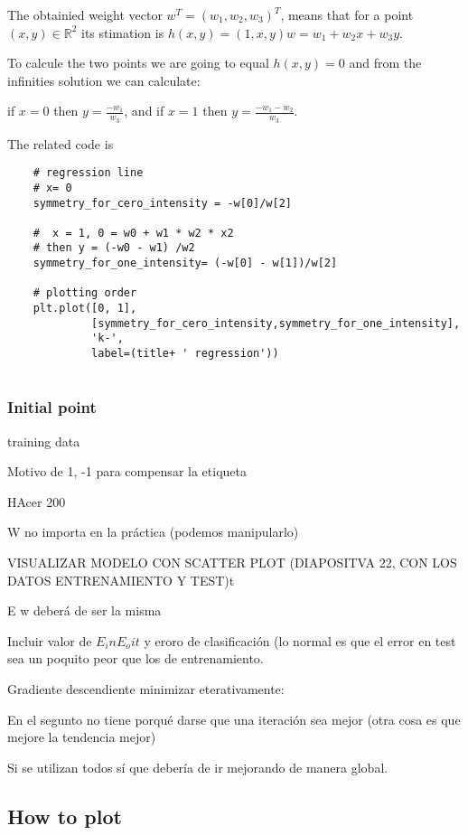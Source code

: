   The obtainied weight vector $w^T = (w_1,w_2,w_3)^T$, means that for a point $(x,y) \in \mathbb R^2$
  its stimation is $h(x,y) = (1,x,y) w = w_1 + w_2x + w_3y$.

  To calcule the two points we are going to equal $h(x,y)=0$ and from the infinities solution we can calculate:

  if $x=0$ then $y = \frac{- w_1}{w_3}$, and if  $x=1$ then $y = \frac{- w_1 - w_2}{w_3}.$
  

  The related code is


  \begin{verbatim}
    # regression line
    # x= 0
    symmetry_for_cero_intensity = -w[0]/w[2]

    #  x = 1, 0 = w0 + w1 * w2 * x2
    # then y = (-w0 - w1) /w2
    symmetry_for_one_intensity= (-w[0] - w[1])/w[2]

    # plotting order
    plt.plot([0, 1],
             [symmetry_for_cero_intensity,symmetry_for_one_intensity],
             'k-',
             label=(title+ ' regression'))
     
  \end{verbatim}

  
  
 
\subsubsection{Initial point}  
training data

Motivo de 1, -1 para compensar la etiqueta

HAcer 200

W no importa en la práctica (podemos manipularlo)

VISUALIZAR MODELO CON SCATTER PLOT (DIAPOSITVA 22, CON LOS DATOS ENTRENAMIENTO Y TEST)t

E w deberá de ser la misma

Incluir valor de $E_in E_oit$ y eroro de clasificación (lo normal es que el error en test sea un poquito peor que los de entrenamiento.

Gradiente descendiente minimizar eterativamente:

En el segunto no tiene porqué darse que una iteración sea mejor (otra cosa es que mejore la tendencia mejor)

Si se utilizan todos sí que debería de ir mejorando de manera global.


\subsection{ How to plot }

